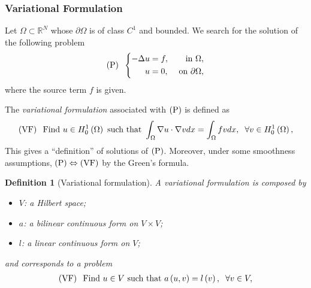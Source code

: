 \documentclass[11pt,a4paper,center,notitlepage]{article}
\numberwithin{equation}{section}
\newtheorem{definition}{Definition}[section]
\begin{document}
\subsubsection{Variational Formulation}
Let $\Omega \subset \mathbb{R}^N$ whose $\partial \Omega$ is of class $C^1$ and bounded. We search for the solution of the following problem
\begin{equation}
\label{1.39}
\left( {\rm P}\right) \hspace{2mm}\left\{ \begin{split}
 - \Delta u &= f, & \mbox{ in }\Omega ,\\
u &= 0, & \mbox{ on }\partial \Omega ,
\end{split} \right.
\end{equation}
where the source term $f$ is given.

The \textit{variational formulation} associated with $\left( {\rm P}\right)$ is defined as
\begin{align}
\left( {\rm VF} \right) \hspace{2mm} \mbox{Find }u \in H_0^1\left( \Omega  \right) \mbox{ such that }\int_\Omega  {\nabla u \cdot \nabla vdx}  = \int_\Omega  {fvdx} ,\hspace{2mm}\forall v \in H_0^1\left( \Omega  \right),
\end{align}
This gives a ``definition'' of solutions of $\left( {\rm P}\right)$. Moreover, under some smoothness assumptions, $\left( {\rm P} \right) \Leftrightarrow \left( {\rm VF} \right)$ by the Green's formula.
\begin{definition}[Variational formulation]
A \emph{variational formulation} is composed by
\begin{itemize}
\item $V$: a Hilbert space;
\item $a$: a bilinear continuous form on $V\times V$;
\item $l$: a linear continuous form on $V$;
\end{itemize}
and corresponds to a problem
\begin{align}
\left( {\rm VF} \right) \hspace{2mm}\mbox{Find } u\in V \mbox{ such that } a\left(u,v\right)=l\left(v\right), \hspace{2mm} \forall v\in V,
\end{align}
\end{definition}
\end{document}
